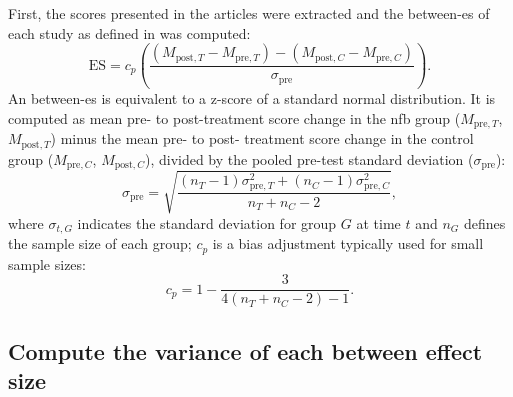 \documentclass[12pt,a4paper,english]{article}
\begin{document}
First, the scores presented in the articles were extracted and the between-\gls{es} of each study as defined in \citet{Morris2008} 
was computed:
\begin{equation}
\label{eq:metareview_effect_size}
\text{ES} = c_p \left(\frac{(M_{\text{post},T} - M_{\text{pre},T}) - (M_{\text{post},C} - M_{\text{pre},C}) }{\sigma_{\text{pre}}} \right).
\end{equation} 
An between-\gls{es} is equivalent to a z-score of a standard normal distribution. It is computed as mean pre- to post-treatment 
score change in the \gls{nfb} group ($M_{\text{pre},T}$, $M_{\text{post},T}$) minus the mean pre- to post- treatment score change 
in the control group ($M_{\text{pre},C}$, $M_{\text{post},C}$), divided by the pooled pre-test standard deviation ($\sigma_{\text{pre}}$):
\begin{equation}
\label{eq:stats_metareview_std_pre}
\sigma_{\text{pre}} = \sqrt{\frac{(n_T - 1)\sigma_{\text{pre},T}^2 + (n_C - 1)\sigma_{\text{pre},C}^2} {n_T + n_C - 2}},
\end{equation}
where $\sigma_{t,G}$ indicates the standard deviation for group $G$ at time $t$ and $n_G$ defines the sample size of each group; 
$c_p$ is a bias adjustment typically used for small sample sizes:
\begin{equation}
\label{eq:metareview_correction_factor}
c_p =  1 - \frac{3} {4(n_T + n_C - 2) - 1}. 
\end{equation} 

\subsection{Compute the variance of each between effect size}
\end{document}
